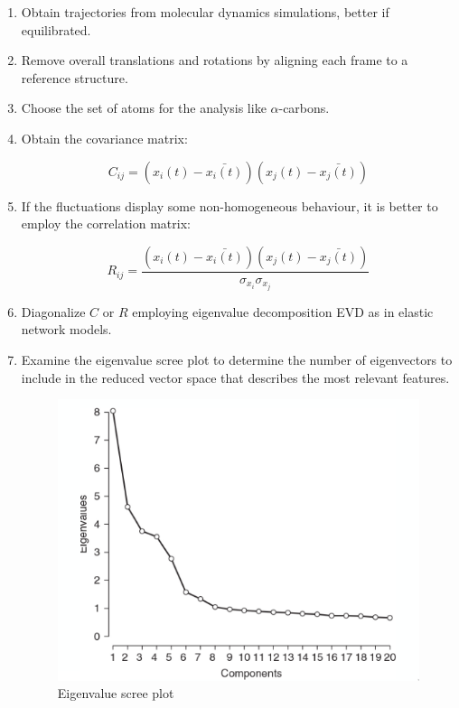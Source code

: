 \begin{enumerate}
	\item Obtain trajectories from molecular dynamics simulations, better if equilibrated.
	\item Remove overall translations and rotations by aligning each frame to a reference structure.
	\item Choose the set of atoms for the analysis like $\alpha$-carbons.
	\item Obtain the covariance matrix:

		$$C_{ij} = (x_i(t) - \bar{x_i(t)})(x_j(t)-\bar{x_j(t)})$$

	\item If the fluctuations display some non-homogeneous behaviour, it is better to employ the correlation matrix:

		$$R_{ij} = \frac{(x_i(t)-\bar{x_i(t)})(x_j(t)-\bar{x_j(t)})}{\sigma_{x_i}\sigma_{x_j}}$$

	\item Diagonalize $C$ or $R$ employing eigenvalue decomposition EVD as in elastic network models.
	\item Examine the eigenvalue scree plot to determine the number of eigenvectors to include in the reduced vector space that describes the most relevant features.

	\begin{figure}[H]
		\includegraphics[width=\textwidth]{eigenvalue-scree-plot}
		\caption{Eigenvalue scree plot}
		\label{fig:eigenvalue-scree-plot}
	\end{figure}


\end{enumerate}
